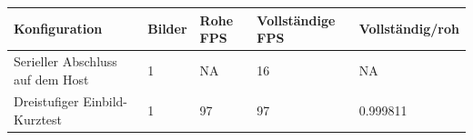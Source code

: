 \begin{tabular}{lllll}
\hline
Konfiguration & Bilder & Rohe FPS & Vollständige FPS & Vollständig/roh \\
\hline
Serieller Abschluss auf dem Host & 1 & NA & 16 & NA \\
Dreistufiger Einbild-Kurztest & 1 & 97 & 97 & 0.999811 \\
\hline
\end{tabular}
